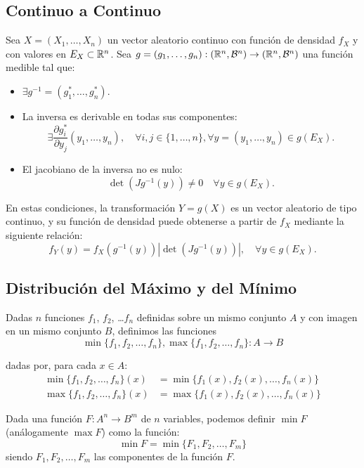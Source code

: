 \subsection{Continuo a Continuo}

Sea $X=(X_1, \ldots, X_n)$ un vector aleatorio continuo con función de densidad $f_X$ y con valores en $E_X\subset \mathbb{R}^n$. Sea $g=(g_1,\dots,g_n):(\mathbb{R}^n, \mathcal{B}^n)\to (\mathbb{R}^n, \mathcal{B}^n)$ una función medible tal que:
\begin{itemize}
    \item $\exists g^{-1}=\left(g_1^{\ast},\dots,g_n^{\ast}\right)$.
    \item La inversa es derivable en todas sus componentes:
    \begin{equation*}
        \exists \dfrac{\partial g_i^{\ast}}{\partial y_j}(y_1,\dots,y_n),\quad \forall i,j\in \{1,\dots,n\},\forall y=(y_1,\dots,y_n)\in g(E_X).
    \end{equation*}
    \item El jacobiano de la inversa no es nulo:
    \begin{equation*}
        \det(Jg^{-1}(y))\neq 0 \quad \forall y\in g(E_X).
    \end{equation*}
\end{itemize}

En estas condiciones, la transformación $Y=g(X)$ es un vector aleatorio de tipo continuo, y su función de densidad puede obtenerse a partir de $f_X$ mediante la siguiente relación:
\begin{equation*}
    f_Y(y) = f_X(g^{-1}(y)) \left|\det(Jg^{-1}(y))\right|, \quad \forall y\in g(E_X).
\end{equation*}


\subsection{Distribución del Máximo y del Mínimo}

\begin{definicion}
    Dadas $n$ funciones $f_1$, $f_2$, \ldots $f_n$ definidas sobre un mismo conjunto $A$ y con imagen en un mismo conjunto $B$, definimos las funciones 
    \begin{equation*}
        \min\{f_1,f_2,\ldots,f_n\},\max\{f_1,f_2,\ldots,f_n\}:A\rightarrow B
    \end{equation*}

    dadas por, para cada $x\in A$:
    \begin{align*}
        \min\{f_1,f_2,\ldots,f_n\}(x) &= \min\{f_1(x),f_2(x),\ldots,f_n(x)\} \\
        \max\{f_1,f_2,\ldots,f_n\}(x) &= \max\{f_1(x),f_2(x),\ldots,f_n(x)\}
    \end{align*}
\end{definicion}
Dada una función $F:A^n\rightarrow B^m$ de $n$ variables, podemos definir $\min F$ (análogamente $\max F$) como la función:
\begin{equation*}
    \min F = \min\{F_1,F_2,\ldots,F_m\}
\end{equation*}
siendo $F_1, F_2, \ldots, F_m$ las componentes de la función $F$.

